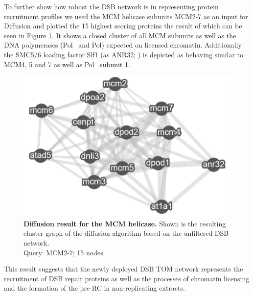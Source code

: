 To further show how robust the DSB network is in representing protein recruitment profiles we used the MCM helicase subunits MCM2-7 as an input for Diffusion and plotted the 15 highest scoring proteins the result of which can be seen in Figure \ref{fig:diff_mcm_dsb}. It shows a closed cluster of all MCM subunits as well as the DNA polymerases (Pol\textdelta~ and Pol\textalpha) expected on licensed chromatin. Additionally the SMC5/6 loading factor Slf1  (as ANR32; \cite{Raschle.2015}) is depicted as behaving similar to MCM4, 5 and 7 as well as Pol\textdelta~ subunit 1. 
\begin{figure}
    \centering
    \includegraphics[width=.5\textwidth]{resources/images/Results/diff_mcm_dsb.PNG}
    \caption[Diffusion result for the MCM helicase]{\textbf{Diffusion result for the MCM helicase. }Shown is the resulting cluster graph of the diffusion algorithm based on the unfiltered DSB network.\\Query: MCM2-7; 15 nodes}
    \label{fig:diff_mcm_dsb}
\end{figure}
This result suggests that the newly deployed DSB TOM network represents the recruitment of DSB repair proteins as well as the processes of chromatin licensing and the formation of the pre-RC in non-replicating extracts.\newpage
